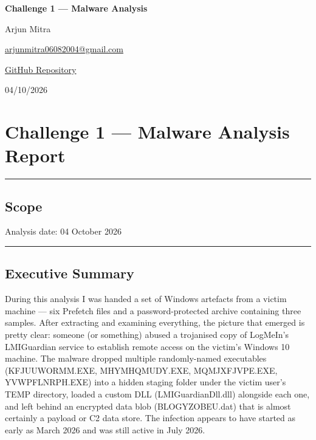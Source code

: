 \documentclass[
]{article}
\author{Arjun Mitra\\\href{mailto:arjunmitra06082004@gmail.com}{arjunmitra06082004@gmail.com}\\\href{https://github.com/TheLearnerAllTime002/Digital-Forensics-Challeng}{GitHub Repository}}
\date{04/10/2026}
\begin{document}
\begin{titlepage}
\centering
\vspace*{2cm}
{\LARGE\bfseries Challenge 1 --- Malware Analysis\par}
\vspace{1.5cm}
{\large Arjun Mitra\par}
\vspace{0.3cm}
{\normalsize \href{mailto:arjunmitra06082004@gmail.com}{arjunmitra06082004@gmail.com}\par}
\vspace{0.3cm}
{\normalsize \href{https://github.com/TheLearnerAllTime002/Digital-Forensics-Challeng}{GitHub Repository}\par}
\vfill
{\large 04/10/2026\par}
\end{titlepage}
\tableofcontents
\newpage


\section{Challenge 1 --- Malware Analysis
Report}\label{challenge-1-malware-analysis-report}

\begin{center}\rule{0.5\linewidth}{0.5pt}\end{center}

\subsection{Scope}\label{scope}

Analysis date: 04 October 2026

\begin{center}\rule{0.5\linewidth}{0.5pt}\end{center}

\subsection{Executive Summary}\label{executive-summary}

During this analysis I was handed a set of Windows artefacts from a
victim machine --- six Prefetch files and a password-protected archive
containing three samples. After extracting and examining everything, the
picture that emerged is pretty clear: someone (or something) abused a
trojanised copy of LogMeIn's LMIGuardian service to establish remote
access on the victim's Windows 10 machine. The malware dropped multiple
randomly-named executables (KFJUUWORMM.EXE, MHYMHQMUDY.EXE,
MQMJXFJVPE.EXE, YVWPFLNRPH.EXE) into a hidden staging folder under the
victim user's TEMP directory, loaded a custom DLL (LMIGuardianDll.dll)
alongside each one, and left behind an encrypted data blob
(BLOGYZOBEU.dat) that is almost certainly a payload or C2 data store.
The infection appears to have started as early as March 2026 and was
still active in July 2026.
\end{document}
